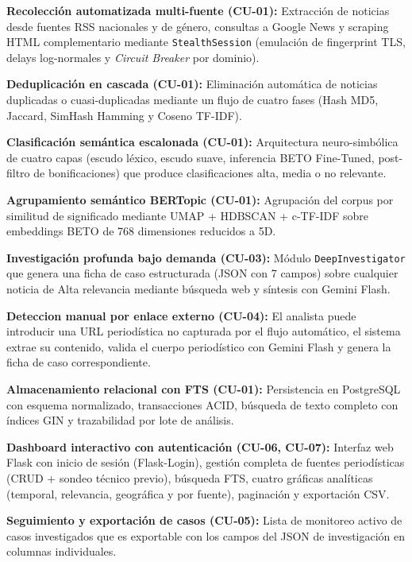 \begin{Titemize}
    \Titem \textbf{Recolección automatizada multi-fuente (CU-01):} Extracción de noticias
    desde fuentes RSS nacionales y de género, consultas a Google News y scraping HTML
    complementario mediante \texttt{StealthSession} (emulación de fingerprint TLS,
    delays log-normales y \textit{Circuit Breaker} por dominio).

    \Titem \textbf{Deduplicación en cascada (CU-01):} Eliminación automática de noticias
    duplicadas o cuasi-duplicadas mediante un flujo de cuatro fases (Hash MD5, Jaccard,
    SimHash Hamming y Coseno TF-IDF).

    \Titem \textbf{Clasificación semántica escalonada (CU-01):} Arquitectura
    neuro-simbólica de cuatro capas (escudo léxico, escudo suave, inferencia BETO Fine-Tuned, 
    post-filtro de bonificaciones) que produce clasificaciones alta, media o no relevante.

    \Titem \textbf{Agrupamiento semántico BERTopic (CU-01):} Agrupación del corpus por
    similitud de significado mediante UMAP + HDBSCAN + c-TF-IDF sobre embeddings BETO de
    768 dimensiones reducidos a 5D.

    \Titem \textbf{Investigación profunda bajo demanda (CU-03):} Módulo
    \texttt{DeepInvestigator} que genera una ficha de caso estructurada (JSON con 7 campos)
    sobre cualquier noticia de Alta relevancia mediante búsqueda web y síntesis con Gemini Flash.

    \Titem \textbf{Deteccion manual por enlace externo (CU-04):} El analista puede
    introducir una URL periodística no capturada por el flujo automático,
    el sistema extrae su contenido, valida el cuerpo periodístico con Gemini Flash y
    genera la ficha de caso correspondiente.

    \Titem \textbf{Almacenamiento relacional con FTS (CU-01):} Persistencia en
    PostgreSQL con esquema normalizado, transacciones ACID, búsqueda de texto
    completo con índices GIN y trazabilidad por lote de análisis.

    \Titem \textbf{Dashboard interactivo con autenticación (CU-06, CU-07):} Interfaz
    web Flask con inicio de sesión (Flask-Login), gestión completa de fuentes periodísticas
    (CRUD + sondeo técnico previo), búsqueda FTS, cuatro gráficas analíticas (temporal,
    relevancia, geográfica y por fuente), paginación y exportación CSV.

    \Titem \textbf{Seguimiento y exportación de casos (CU-05):} Lista de monitoreo activo
    de casos investigados que es exportable con los campos del JSON de investigación en columnas individuales.
\end{Titemize}

